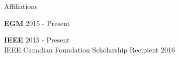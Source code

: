 \documentclass{resume} %
\begin{document}
\begin{rSection}{Affiliations}

    {\bf EGM} \hfill {2015 - Present} 

    {\bf IEEE} \hfill {2015 - Present} 
    \\IEEE Canadian Foundation Scholarship Recipient \hfill {2016}

    \end{rSection}
\end{document}

